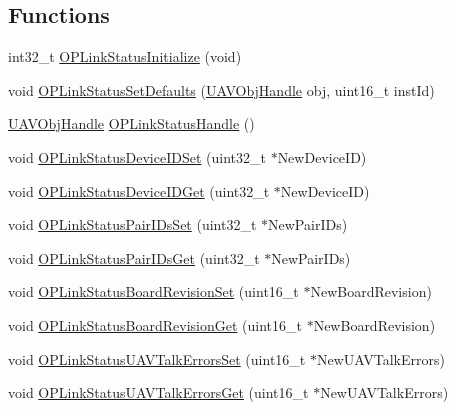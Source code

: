 \subsection*{\-Functions}
\begin{DoxyCompactItemize}
\item 
int32\-\_\-t \hyperlink{group___o_p_link_status_gaed2b8a4078433ea133371d9333b49941}{\-O\-P\-Link\-Status\-Initialize} (void)
\item 
void \hyperlink{group___o_p_link_status_ga4bf40602e61c00596d893d10b6276c7d}{\-O\-P\-Link\-Status\-Set\-Defaults} (\hyperlink{targets_2_u_a_v_objects_2inc_2uavobjectmanager_8h_a279053e22be53ce9f895043aaeb91e3b}{\-U\-A\-V\-Obj\-Handle} obj, uint16\-\_\-t inst\-Id)
\item 
\hyperlink{targets_2_u_a_v_objects_2inc_2uavobjectmanager_8h_a279053e22be53ce9f895043aaeb91e3b}{\-U\-A\-V\-Obj\-Handle} \hyperlink{group___o_p_link_status_ga894fcad496afbb8c8b1f452c6c4193d0}{\-O\-P\-Link\-Status\-Handle} ()
\item 
void \hyperlink{group___o_p_link_status_gae707b0dd910af8016bd3a69438a59447}{\-O\-P\-Link\-Status\-Device\-I\-D\-Set} (uint32\-\_\-t $\ast$\-New\-Device\-I\-D)
\item 
void \hyperlink{group___o_p_link_status_gac7a7b4acd775cb8d637089900e5dca54}{\-O\-P\-Link\-Status\-Device\-I\-D\-Get} (uint32\-\_\-t $\ast$\-New\-Device\-I\-D)
\item 
void \hyperlink{group___o_p_link_status_gaaaf7e74a83c2fd52f00022f1e02ccf95}{\-O\-P\-Link\-Status\-Pair\-I\-Ds\-Set} (uint32\-\_\-t $\ast$\-New\-Pair\-I\-Ds)
\item 
void \hyperlink{group___o_p_link_status_gad3a9958ebf07f0f814d8db6cbbfe835a}{\-O\-P\-Link\-Status\-Pair\-I\-Ds\-Get} (uint32\-\_\-t $\ast$\-New\-Pair\-I\-Ds)
\item 
void \hyperlink{group___o_p_link_status_gaceb9631cb88f1bcd64c577fbbde4e09f}{\-O\-P\-Link\-Status\-Board\-Revision\-Set} (uint16\-\_\-t $\ast$\-New\-Board\-Revision)
\item 
void \hyperlink{group___o_p_link_status_gaba6bdde394d7eb0d87e9d2e4fadb12c5}{\-O\-P\-Link\-Status\-Board\-Revision\-Get} (uint16\-\_\-t $\ast$\-New\-Board\-Revision)
\item 
void \hyperlink{group___o_p_link_status_gaeea30ae38f92c434c673232ba5b973eb}{\-O\-P\-Link\-Status\-U\-A\-V\-Talk\-Errors\-Set} (uint16\-\_\-t $\ast$\-New\-U\-A\-V\-Talk\-Errors)
\item 
void \hyperlink{group___o_p_link_status_ga71ea624347ee478f55a1d98dcd97f531}{\-O\-P\-Link\-Status\-U\-A\-V\-Talk\-Errors\-Get} (uint16\-\_\-t $\ast$\-New\-U\-A\-V\-Talk\-Errors)

\end{DoxyCompactItemize}
